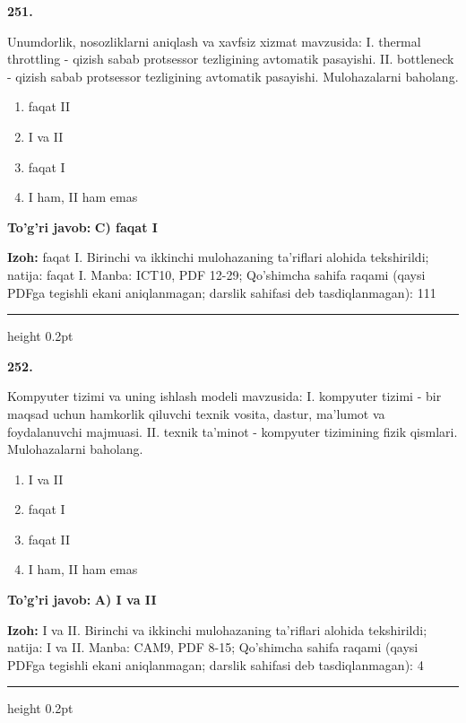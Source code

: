 \documentclass[10pt,a4paper]{article}
\begin{document}
{\bfseries\sffamily\color{ink} 251.}
\par
Unumdorlik, nosozliklarni aniqlash va xavfsiz xizmat mavzusida: I. thermal throttling - qizish sabab protsessor tezligining avtomatik pasayishi. II. bottleneck - qizish sabab protsessor tezligining avtomatik pasayishi. Mulohazalarni baholang.
\begin{enumerate}[label=\Alph*),leftmargin=9mm]
\item faqat II
\item I va II
\item faqat I
\item I ham, II ham emas
\end{enumerate}
\begin{tcolorbox}[enhanced,breakable,colback=teal!4,colframe=teal!60!black,boxrule=0.45pt,arc=1.2mm,left=2.7mm,right=2.7mm,top=1.8mm,bottom=1.8mm,before skip=2mm,after skip=2mm]
{\bfseries\sffamily\color{teal}To'g'ri javob:} \textbf{C) faqat I}
\par\smallskip
{\bfseries Izoh:} faqat I. Birinchi va ikkinchi mulohazaning ta'riflari alohida tekshirildi; natija: faqat I. Manba: ICT10, PDF 12-29; Qo'shimcha sahifa raqami (qaysi PDFga tegishli ekani aniqlanmagan; darslik sahifasi deb tasdiqlanmagan): 111
\end{tcolorbox}
\vspace{2mm}\hrule height 0.2pt\vspace{3mm}

{\bfseries\sffamily\color{ink} 252.}
\par
Kompyuter tizimi va uning ishlash modeli mavzusida: I. kompyuter tizimi - bir maqsad uchun hamkorlik qiluvchi texnik vosita, dastur, ma'lumot va foydalanuvchi majmuasi. II. texnik ta'minot - kompyuter tizimining fizik qismlari. Mulohazalarni baholang.
\begin{enumerate}[label=\Alph*),leftmargin=9mm]
\item I va II
\item faqat I
\item faqat II
\item I ham, II ham emas
\end{enumerate}
\begin{tcolorbox}[enhanced,breakable,colback=teal!4,colframe=teal!60!black,boxrule=0.45pt,arc=1.2mm,left=2.7mm,right=2.7mm,top=1.8mm,bottom=1.8mm,before skip=2mm,after skip=2mm]
{\bfseries\sffamily\color{teal}To'g'ri javob:} \textbf{A) I va II}
\par\smallskip
{\bfseries Izoh:} I va II. Birinchi va ikkinchi mulohazaning ta'riflari alohida tekshirildi; natija: I va II. Manba: CAM9, PDF 8-15; Qo'shimcha sahifa raqami (qaysi PDFga tegishli ekani aniqlanmagan; darslik sahifasi deb tasdiqlanmagan): 4
\end{tcolorbox}
\vspace{2mm}\hrule height 0.2pt\vspace{3mm}
\end{document}
